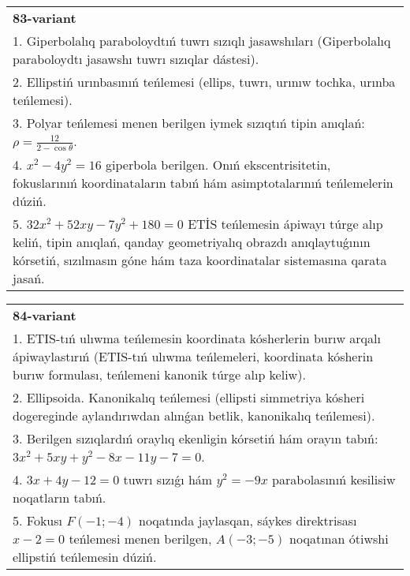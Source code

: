 \documentclass{article}
\begin{document}
\begin{tabular}{m{17cm}}
\textbf{83-variant}\\
1. Giperbolalıq paraboloydtıń tuwrı sızıqlı jasawshıları (Giperbolalıq paraboloydtı jasawshı tuwrı sızıqlar dástesi).\\

2. Ellipstiń urınbasınıń teńlemesi (ellips, tuwrı, urınıw tochka, urınba teńlemesi).\\

3. Polyar teńlemesi menen berilgen iymek sızıqtıń tipin anıqlań: $\rho=\frac{12}{2-\cos\theta}$.\\

4. $x^{2} - 4y^{2} = 16$ giperbola berilgen. Onıń ekscentrisitetin, fokuslarınıń koordinataların tabıń hám asimptotalarınıń teńlemelerin dúziń.\\

5. $32x^{2} + 52xy - 7y^{2} + 180 = 0$ ETİS teńlemesin ápiwayı túrge alıp keliń, tipin anıqlań, qanday geometriyalıq obrazdı anıqlaytuǵının kórsetiń, sızılmasın góne hám taza koordinatalar sistemasına qarata jasań.  
\end{tabular}
\vspace{1cm}


\begin{tabular}{m{17cm}}
\textbf{84-variant}\\
1. ETIS-tıń ulıwma teńlemesin koordinata kósherlerin burıw arqalı ápiwaylastırıń (ETIS-tıń ulıwma teńlemeleri, koordinata kósherin burıw formulası, teńlemeni kanonik túrge alıp keliw).\\

2. Ellipsoida. Kanonikalıq teńlemesi (ellipsti simmetriya kósheri dogereginde aylandırıwdan alınǵan betlik, kanonikalıq teńlemesi).\\

3. Berilgen sızıqlardıń oraylıq ekenligin kórsetiń hám orayın tabıń: $3 x^{2}+5 xy+y^{2}-8 x-11 y-7=0$.\\

4. $3x + 4y - 12 = 0$ tuwrı sızıǵı hám $y^{2} = - 9x$ parabolasınıń kesilisiw noqatların tabıń.  \\

5. Fokusı $F( - 1; - 4)$ noqatında jaylasqan, sáykes direktrisası $x - 2 = 0$ teńlemesi menen berilgen, $A( - 3; - 5)$ noqatınan ótiwshi ellipstiń teńlemesin dúziń.  
\end{tabular}
\vspace{1cm}
\end{document}
